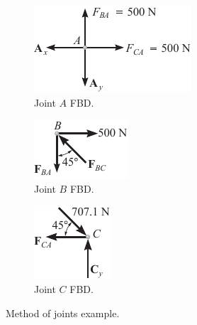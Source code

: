 \documentclass{article}
\begin{document}
\begin{figure}[H]
    \vspace*{1.5em}
    \begin{subfigure}{0.3\linewidth}
        \centering
        \includegraphics[height = 0.5\linewidth, keepaspectratio = true]{figures/method_of_joints_a.pdf}
        \caption{Joint \(A\) FBD.}
    \end{subfigure}
    \begin{subfigure}{0.3\linewidth}
        \centering
        \includegraphics[height = 0.5\linewidth, keepaspectratio = true]{figures/method_of_joints_b.pdf}
        \caption{Joint \(B\) FBD.}
    \end{subfigure}
    \begin{subfigure}{0.3\linewidth}
        \centering
        \includegraphics[height = 0.5\linewidth, keepaspectratio = true]{figures/method_of_joints_c.pdf}
        \caption{Joint \(C\) FBD.}
    \end{subfigure}
    \caption{Method of joints example.} %
\end{figure}
\end{document}
